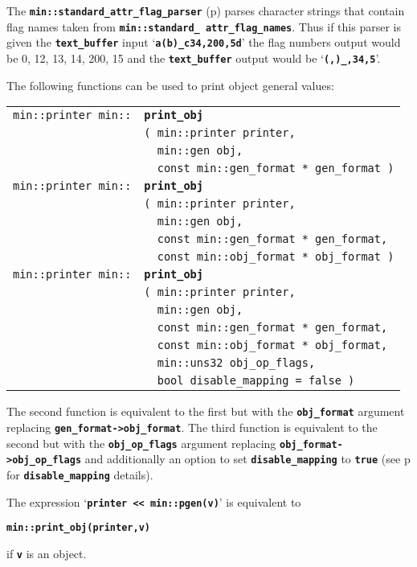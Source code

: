 \documentclass[12pt]{article}
\makeatletter
\newcommand{\TT}[1]{{\tt \bfseries #1}}
\newcommand{\ttindex}[1]{\index{#1@{\tt #1}}}
\newcommand{\pagref}[1]{p\pageref{#1}}
\newcommand{\EOL}{\penalty \exhyphenpenalty}
\newenvironment{indpar}[1][0.3in]%
	{\begin{list}{}%
		     {\setlength{\itemsep}{0in}%
		      \setlength{\topsep}{0in}%
		      \setlength{\parsep}{1ex}%
		      \setlength{\labelwidth}{#1}%
		      \setlength{\leftmargin}{#1}%
		      \addtolength{\leftmargin}{\labelsep}}%
	 \item}%
	{\end{list}}
\newcommand{\LABEL}[1]{\label{#1}}
\newlength{\ARGBREAKLENGTH}
\newcommand{\ARGBREAK}[1][\ARGBREAKLENGTH]{\\&\hspace*{#1}}
\newcommand{\MINKEY}[1]%
	   {\TT{#1}\ttindex{min::#1}\ttindex{#1}}
\makeatother
\begin{document}
The \TT{min::standard\_attr\_flag\_parser}
(\pagref{MIN::STANDARD_ATTR_FLAG_PARSER})
parses character strings
that contain flag names taken from \TT{min::\EOL standard\_\EOL
attr\_\EOL flag\_\EOL names}.  Thus if this parser is given
the \TT{text\_\EOL buffer} input `\TT{*a(b)\_c34,200,5d}' the
flag numbers output would be 0, 12, 13, 14, 200, 15 and the
\TT{text\_\EOL buffer} output would be `\TT{(,)\_,34,5}'.

The following functions can be used to print object general values:

\begin{indpar}[1em]\begin{tabular}{r@{}l}
\verb|min::printer min::| & \MINKEY{print\_obj}\ARGBREAK
    \verb|( min::printer printer,|\ARGBREAK
    \verb|  min::gen obj,|\ARGBREAK
    \verb|  const min::gen_format * gen_format )|
\LABEL{MIN::PRINT_OBJ} \\
\verb|min::printer min::| & \MINKEY{print\_obj}\ARGBREAK
    \verb|( min::printer printer,|\ARGBREAK
    \verb|  min::gen obj,|\ARGBREAK
    \verb|  const min::gen_format * gen_format,|\ARGBREAK
    \verb|  const min::obj_format * obj_format )|
\LABEL{MIN::PRINT_OBJ_WITH_OBJ_FORMAT} \\
\verb|min::printer min::| & \MINKEY{print\_obj}\ARGBREAK
    \verb|( min::printer printer,|\ARGBREAK
    \verb|  min::gen obj,|\ARGBREAK
    \verb|  const min::gen_format * gen_format,|\ARGBREAK
    \verb|  const min::obj_format * obj_format,|\ARGBREAK
    \verb|  min::uns32 obj_op_flags,|\ARGBREAK
    \verb|  bool disable_mapping = false )|
\LABEL{MIN::PRINT_OBJ_WITH_OBJ_FORMAT_AND_FLAGS} \\
\end{tabular}\end{indpar}

The second function is equivalent to the first but with
the \TT{obj\_\EOL format} argument replacing
\TT{gen\_\EOL format->obj\_\EOL format}.
The third function is equivalent to the second but with
the \TT{obj\_\EOL op\_\EOL flags} argument replacing
\TT{obj\_\EOL format->obj\_\EOL op\_\EOL flags} and
additionally an option to set \TT{disable\_\EOL mapping} to \TT{true}
(see \pagref{DEFINED-FORMAT-TYPE-TRANSLATION} for \TT{disable\_\EOL mapping}
details).

The expression `\TT{printer~<{}<~min::pgen(v)}' is equivalent to
\begin{center}
\TT{min::print\_obj(printer,v)}
\end{center}
if \TT{v} is an object.
\end{document}

